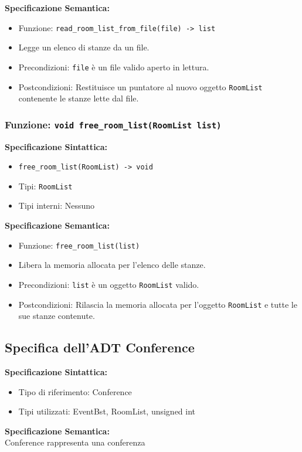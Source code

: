 \documentclass[11pt]{scrartcl} %
\begin{document}
\textbf{Specificazione Semantica:}
\begin{itemize}
\item Funzione: \texttt{read\_room\_list\_from\_file(file) -> list}
\item Legge un elenco di stanze da un file.
\item Precondizioni: \texttt{file} è un file valido aperto in lettura.
\item Postcondizioni: Restituisce un puntatore al nuovo oggetto \texttt{RoomList} contenente le stanze lette dal file.
\end{itemize}

\subsubsection{Funzione: \texttt{void free\_room\_list(RoomList list)}}

\textbf{Specificazione Sintattica:}
\begin{itemize}
\item \texttt{free\_room\_list(RoomList) -> void}
\item Tipi: \texttt{RoomList}
\item Tipi interni: Nessuno
\end{itemize}

\textbf{Specificazione Semantica:}
\begin{itemize}
\item Funzione: \texttt{free\_room\_list(list)}
\item Libera la memoria allocata per l'elenco delle stanze.
\item Precondizioni: \texttt{list} è un oggetto \texttt{RoomList} valido.
\item Postcondizioni: Rilascia la memoria allocata per l'oggetto \texttt{RoomList} e tutte le sue stanze contenute.
\end{itemize}

\subsection{Specifica dell'ADT Conference}

\textbf{Specificazione Sintattica:}
\begin{itemize}
	\item Tipo di riferimento: Conference
	\item Tipi utilizzati: EventBst, RoomList, unsigned int
\end{itemize}
\textbf{Specificazione Semantica:} \\
Conference rappresenta una conferenza\\
\end{document}
